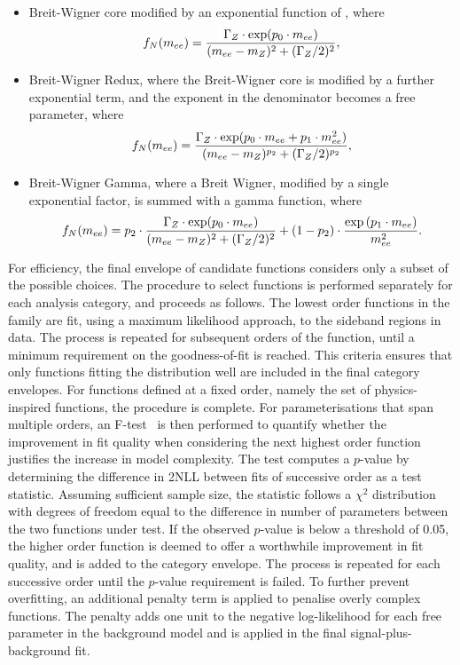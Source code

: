 \begin{itemize}
\item Breit-Wigner core modified by an exponential function of \mee, where
\begin{equation*}
f_N(m_{ee}) = \frac{\Gamma_{Z}\cdot\exp(p_{0}\cdot m_{ee})}{(m_{ee} - m_{Z})^{2} + (\Gamma_{Z}/2)^{2}},
\end{equation*}
\item Breit-Wigner Redux, where the Breit-Wigner core is modified by a further exponential term, and the exponent in the denominator becomes a free parameter, where
\begin{equation*}
f_N(m_{ee}) = \frac{\Gamma_{Z}\cdot\exp(p_{0}\cdot m_{ee} + p_{1}\cdot m_{ee}^{2})}{(m_{ee} - m_{Z})^{p_{2}} + (\Gamma_{Z}/2)^{p_{2}}},
\end{equation*}
\item Breit-Wigner Gamma, where a Breit Wigner, modified by a single exponential factor, is summed with a gamma function, where
\begin{equation*}
f_N(m_{ee}) = p_{2}\cdot\frac{\Gamma_{Z}\cdot\exp(p_{0}\cdot m_{ee})}{(m_{ee} - m_{Z})^{2} + (\Gamma_{Z}/2)^{2}} + (1-p_{2})\cdot\frac{\exp{(p_{1}\cdot\ensuremath{m_{ee}})}}{m_{ee}^{2}}.
\end{equation*}
\end{itemize}

\noindent For efficiency, the final envelope of candidate functions considers only a subset of the possible choices. The procedure to select functions is performed separately for each analysis category, and proceeds as follows. The lowest order functions in the family are fit, using a maximum likelihood approach, to the \mee sideband regions in data. The process is repeated for subsequent orders of the function, until a minimum requirement on the goodness-of-fit is reached. This criteria ensures that only functions fitting the \mee distribution well are included in the final category envelopes. For functions defined at a fixed order, namely the set of physics-inspired functions, the procedure is complete. For parameterisations that span multiple orders, an F-test~\cite{f_test} is then performed to quantify whether the improvement in fit quality when considering the next highest order function justifies the increase in model complexity. The test computes a $p$-value by determining the difference in 2NLL between fits of successive order as a test statistic. Assuming sufficient sample size, the statistic follows a $\chi^{2}$ distribution with degrees of freedom equal to the difference in number of parameters between the two functions under test. If the observed $p$-value is below a threshold of 0.05, the higher order function is deemed to offer a worthwhile improvement in fit quality, and is added to the category envelope. The process is repeated for each successive order until the $p$-value requirement is failed.  %
To further prevent overfitting, an additional penalty term is applied to penalise overly complex functions. The penalty adds one unit to the negative log-likelihood for each free parameter in the background model and is applied in the final signal-plus-background fit.

